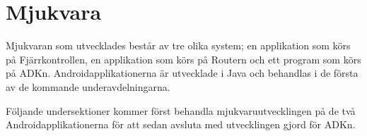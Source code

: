 \section{Mjukvara}
\label{sec:Funktionalitet}
Mjukvaran som utvecklades består av tre olika system; en applikation som körs på
Fjärrkontrollen, en applikation som körs på Routern och ett program som körs på
ADKn. Androidapplikationerna är utvecklade i Java och behandlas i de första av
de kommande underavdelningarna.

Följande undersektioner kommer först behandla mjukvaruutvecklingen på de två
Androidapplikationerna för att sedan avsluta med utvecklingen gjord för ADKn.







